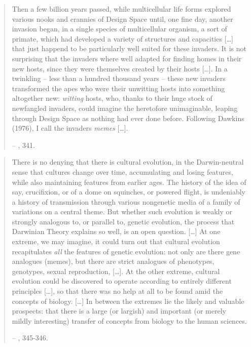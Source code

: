 \documentclass[openany,twoside,twocolumn]{book}
\begin{document}
\begin{quote}
Then a few billion years passed, while multicellular life forms explored various nooks and crannies of Design Space until, one fine day, another invasion began, in a single species of multicellular organism, a sort of primate, which had developed a variety of structures and capacities {[}\ldots{}{]} that just happend to be particularly well suited for these invaders. It is not surprising that the invaders where well adapted for finding homes in their new hosts, since they were themselves created by their hosts {[}\ldots{}{]}. In a twinkling -- less than a hundred thousand years -- these new invaders transformed the apes who were their unwitting hosts into something altogether new: \emph{witting} hosts, who, thanks to their huge stock of newfangled invaders, could imagine the heretofore unimaginable, leaping through Design Space as nothing had ever done before. Following Dawkins (1976), I call the invaders \emph{memes} {[}\ldots{}{]}.

-- \textcite{dennett_darwins_1995}, 341.
\end{quote}

\begin{quote}
There is no denying that there is cultural evolution, in the Darwin-neutral sense that cultures change over time, accumulating and losing features, while also maintaining features from earlier ages. The history of the idea of say, crucifixion, or of a dome on squinches, or powered flight, is undeniably a history of transmission through various nongenetic media of a family of variations on a central theme. But whether such evolution is weakly or strongly analogous to, or parallel to, genetic evolution, the process that Darwinian Theory explains so well, is an open question. {[}\ldots{}{]} At one extreme, we may imagine, it could turn out that cultural evolution recapitulates \emph{all} the features of genetic evolution: not only are there gene analogues (memes), but there are strict analogues of phenotypes, genotypes, sexual reproduction, {[}\ldots{}{]}. At the other extreme, cultural evolution could be discovered to operate according to entirely different principles {[}\ldots{}{]}, so that there was no help at all to be found amid the concepts of biology. {[}\ldots{}{]} In between the extremes lie the likely and valuable prospects: that there is a large (or largish) and important (or merely mildly interesting) transfer of concepts from biology to the human sciences.

-- \textcite{dennett_darwins_1995}, 345-346.
\end{quote}
\end{document}
